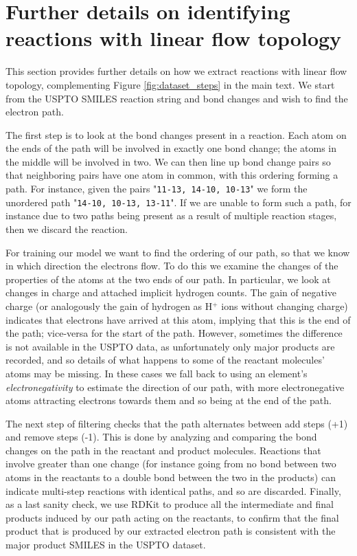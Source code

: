 \section{Further details on identifying reactions with linear flow topology}
\label{sect:electron_path_identify}

This section provides further details on how we extract reactions with linear flow topology, complementing Figure \ref{fig:dataset_steps} in the main text. 
We start from the USPTO SMILES reaction string and bond changes and wish to find the electron path.

The first step is to look at the bond changes present in a reaction. 
Each atom on the ends of the path will be involved in exactly one bond change;
the atoms in the middle will be involved in two. 
We can then line up bond change pairs so that neighboring pairs have one atom in common,
 with this ordering forming a path.
For instance, given the pairs "\texttt{11-13, 14-10, 10-13}" we form the unordered path "\texttt{14-10, 10-13, 13-11}".
If we are unable to form such a path, for instance due to two paths being present as a result of multiple reaction stages, then we discard the reaction.

For training our model we want to find the ordering of our path, so that we know in which direction the electrons flow.
To do this we examine the changes of the properties of the atoms at the two ends of our path. 
In particular, we look at changes in charge and attached implicit hydrogen counts. 
The gain of negative charge (or analogously the gain of hydrogen as H$^+$ ions without changing charge) indicates that electrons have arrived at this atom, 
implying that this is the end of the path; 
vice-versa for the start of the path.
However, sometimes the difference is not available in the USPTO data, as unfortunately only major products are recorded, and so details of what happens to some of the reactant molecules' atoms may be missing.
In these cases we fall back to using an element's {\em electronegativity} to estimate the direction of our path, with more electronegative atoms attracting electrons towards them and so being at the end of the path. 

The next step of filtering checks that the path alternates between add steps (+1) and remove steps (-1). 
This is done by analyzing and comparing the bond changes on the path in the reactant and product molecules. 
Reactions that involve greater than one change (for instance going from no bond between two atoms in the reactants to a double bond between the two in the products) can indicate multi-step 
reactions with identical paths, and so are discarded.
Finally, as a last sanity check, we use RDKit to produce all the intermediate and final products induced by our path acting on the reactants,
to confirm that the final product that is produced by our extracted electron path is consistent with the major product SMILES in the USPTO dataset.

